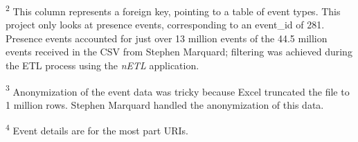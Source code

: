 \begin{table}[H]
\begin{threeparttable}
\begin{tablenotes}
            \item[\textsuperscript{2}]This column represents a foreign key, pointing to a table of event types. This project only looks at presence events, corresponding to an event\_id of 281. Presence events accounted for just over 13 million events of the 44.5 million events received in the CSV from Stephen Marquard; filtering was achieved during the ETL process using the \textit{nETL} application.
            \item[\textsuperscript{3}]Anonymization of the event data was tricky because Excel truncated the file to 1 million rows. Stephen Marquard handled the anonymization of this data.
            \item[\textsuperscript{4}]Event details are for the most part URIs.
        \end{tablenotes}
    \end{threeparttable}
\end{table}


